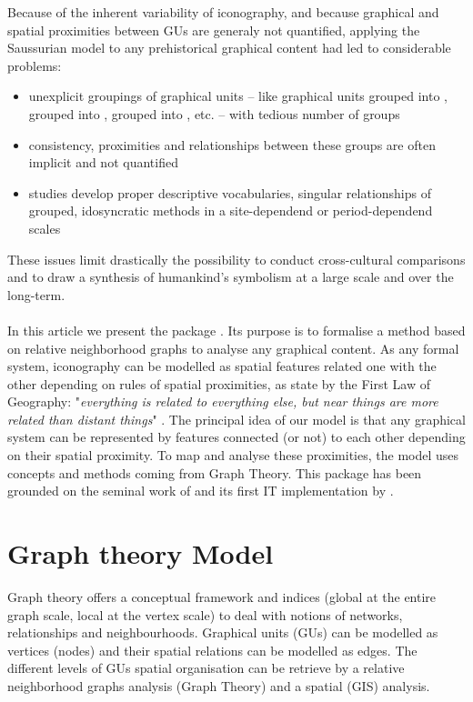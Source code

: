 \documentclass[article]{jss}\usepackage{knitr}
\begin{document}
Because of the inherent variability of iconography, and because graphical and spatial proximities between GUs are generaly not quantified, applying the Saussurian model to any prehistorical graphical content had led to considerable problems:
\begin{itemize}
\setlength\itemsep{.05em}
  \item unexplicit groupings of graphical units -- like graphical units grouped into ,   grouped into ,  grouped into , etc. -- with tedious number of groups
  \item consistency, proximities and relationships between these groups are often implicit and not quantified
  \item studies develop proper descriptive vocabularies, singular relationships of grouped, idosyncratic methods in a site-dependend or period-dependend scales 
\end{itemize}

These issues limit drastically the possibility to conduct cross-cultural comparisons and to draw a synthesis of humankind's symbolism at a large scale and over the long-term. 
\\
\\
In this article we present the  package . Its purpose is to formalise a method based on relative neighborhood graphs to analyse any graphical content. As any formal system, iconography can be modelled as spatial features related one with the other depending on rules of spatial proximities, as state by the First Law of Geography: "\emph{everything is related to everything else, but near things are more related than distant things}" \citep{Tobler70}. The principal idea of our model is that any graphical system can be represented by features connected (or not) to each other depending on their spatial proximity. To map and analyse these proximities, the model uses concepts and methods coming from Graph Theory. This package has been grounded on the seminal work of \citet{Alexander08} and its first IT implementation by \citet{Huet18a}. 

\section[Model]{Graph theory Model} \label{sec:model}

Graph theory offers a conceptual framework and indices (global at the entire graph scale, local at the vertex scale) to deal with notions of networks, relationships and neighbourhoods. Graphical units (GUs) can be modelled as vertices (nodes) and their spatial relations can be modelled as edges. The different levels of GUs spatial organisation can be retrieve by a relative neighborhood graphs analysis (Graph Theory) and a spatial (GIS) analysis.
\end{document}
